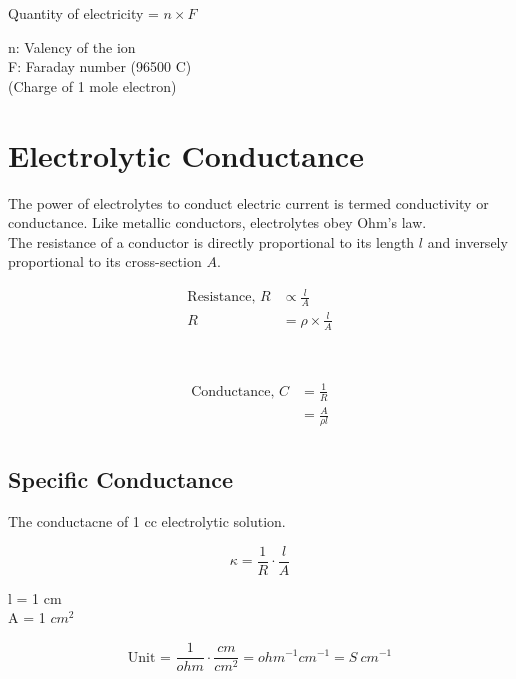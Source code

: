 \documentclass[12pt]{article}
\begin{document}
\begin{minipage}{0.45\textwidth}
    \quad\quad\quad\quad Quantity of electricity = $n \times F$
\end{minipage}
\hfill\vline\hfill
\begin{minipage}{0.5\textwidth}
    n: Valency of the ion \\
    F: Faraday number (96500 C) \\
    (Charge of 1 mole electron) \\
\end{minipage}
\vspace{1cm}

\section*{Electrolytic Conductance}
The power of electrolytes to conduct electric current is termed conductivity or conductance. Like metallic conductors, electrolytes obey Ohm's law. \\
The resistance of a conductor is directly proportional to its length $l$ and inversely proportional to its cross-section $A$. \\
\begin{minipage}{0.7\textwidth}
    \begin{align*}
        \text{Resistance, }
        R &\propto \frac{l}{A} \\
        R &= \rho \times \frac{l}{A}
    \end{align*}
\end{minipage} \\
\begin{minipage}{0.7\textwidth}
    \begin{align*}
        \text{Conductance, }
        C &= \frac{1}{R} \\
        &= \frac{A}{\rho l} \\
    \end{align*}
\end{minipage}

\subsection*{Specific Conductance}
The conductacne of 1 cc electrolytic solution. \\
\begin{minipage}{0.5\textwidth}
    $$ \kappa = \frac{1}{R} \cdot \frac{l}{A} $$
\end{minipage}
\hfill\vline\hfill
\begin{minipage}{0.4\textwidth}
    l = 1 cm \\
    A = 1 $cm^2$
\end{minipage}
$$ \text{Unit = } \frac{1}{ohm} \cdot \frac{cm}{cm^2} = ohm^{-1}cm^{-1} = S \ cm^{-1} $$
\end{document}
